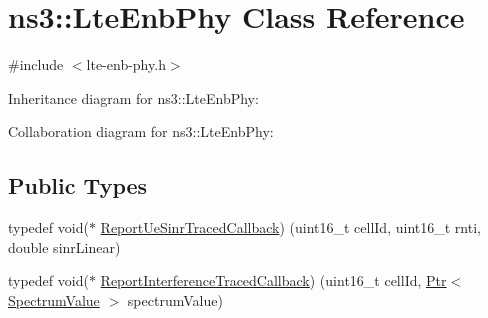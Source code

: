 \hypertarget{classns3_1_1LteEnbPhy}{}\section{ns3\+:\+:Lte\+Enb\+Phy Class Reference}
\label{classns3_1_1LteEnbPhy}


{\ttfamily \#include $<$lte-\/enb-\/phy.\+h$>$}



Inheritance diagram for ns3\+:\+:Lte\+Enb\+Phy\+:


Collaboration diagram for ns3\+:\+:Lte\+Enb\+Phy\+:
\subsection*{Public Types}
\begin{DoxyCompactItemize}
\item 
typedef void($\ast$ \hyperlink{classns3_1_1LteEnbPhy_a8b6e4deec766284ab2101c5b21d255bf}{Report\+Ue\+Sinr\+Traced\+Callback}) (uint16\+\_\+t cell\+Id, uint16\+\_\+t rnti, double sinr\+Linear)
\item 
typedef void($\ast$ \hyperlink{classns3_1_1LteEnbPhy_ae482b6691c7f55adf7ae82ea64e61d72}{Report\+Interference\+Traced\+Callback}) (uint16\+\_\+t cell\+Id, \hyperlink{classns3_1_1Ptr}{Ptr}$<$ \hyperlink{classns3_1_1SpectrumValue}{Spectrum\+Value} $>$ spectrum\+Value)
\end{DoxyCompactItemize}
